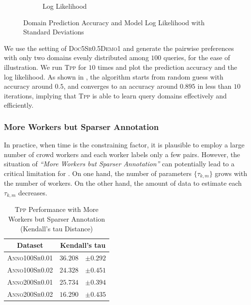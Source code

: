 \begin{figure}[h!]
\begin{subfigure}[b]{.5\linewidth}
      \caption{Log Likelihood} \label{fig::dp_loglikeli.eps}
		\end{subfigure}
	\caption{Domain Prediction Accuracy and Model Log Likelihood with Standard Deviations}
  \label{fig::dp}
\end{figure}

We use the setting of \textsc{Doc5Sr0.5Demo1} and generate the pairwise
preferences with only two domains evenly distributed among $100$ queries, for
the ease of illustration.  We run \textsc{Tpp} for $10$ times and plot the
prediction accuracy and the log likelihood. As shown in ,
the algorithm starts from random guess with accuracy around $0.5$, and converges
to an accuracy around $0.895$ in less than $10$ iterations, implying that
\textsc{Tpp} is able to learn query domains effectively and efficiently.

\subsubsection{More Workers but Sparser Annotation}

In practice, when time is the constraining factor, it is plausible to employ a
large number of crowd workers and each worker labels only a few pairs. However,
the situation of \emph{``More Workers but Sparser Annotation''} can potentially
lead to a critical limitation for \tpp{}. On one hand, the number of
parameters $\{\tau_{k,m}\}$ grows with the number of workers. On the other hand,
the amount of data to estimate each $\tau_{k,m}$ decreases.

\begin{table}[h]
  \caption{\textsc{Tpp} Performance with More Workers but Sparser Annotation
  (Kendall's tau Distance)}
\begin{center}
\begin{tabular}{c|rl}
\hline \hline
Dataset	&	\multicolumn{2}{c}{Kendall's tau} \\ \hline \hline
\textsc{Anno100Sr0.01}	& $36.208$	& $\pm0.292$ \\
\textsc{Anno100Sr0.02} 	& $24.328$	& $\pm0.451$ \\
\textsc{Anno200Sr0.01} 	& $25.734$	& $\pm0.394$ \\
\textsc{Anno200Sr0.02} 	& $16.290$	& $\pm0.435$ \\ \hline \hline
\end{tabular}
\end{center}
\label{tab::sparse_anno}
\end{table}%


